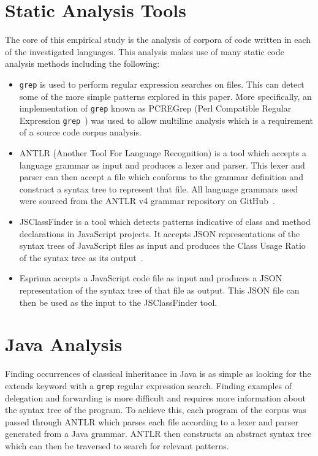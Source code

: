 \section{Static Analysis Tools}
The core of this empirical study is the analysis of corpora of code written in each of the investigated languages. This analysis makes use of many static code analysis methods including the following:
\begin{itemize}
	\item \texttt{grep} is used to perform regular expression searches on files. This can detect some of the more simple patterns explored in this paper. More specifically, an implementation of \texttt{grep} known as PCREGrep (Perl Compatible Regular Expression \texttt{grep}~\cite{Pcregrep}) was used to allow multiline analysis which is a requirement of a source code corpus analysis.
	\item ANTLR (Another Tool For Language Recognition) is a tool which accepts a language grammar as input and produces a lexer and parser. This lexer and parser can then accept a file which conforms to the grammar definition and construct a syntax tree to represent that file. All language grammars used were sourced from the ANTLR v4 grammar repository on GitHub~\cite{AntlrGrammars}.
	\item JSClassFinder is a tool which detects patterns indicative of class and method declarations in JavaScript projects. It accepts JSON representations of the syntax trees of JavaScript files as input and produces the Class Usage Ratio of the syntax tree as its output~\cite{JSClassFinder}.
	\item Esprima accepts a JavaScript code file as input and produces a JSON representation of the syntax tree of that file as output. This JSON file can then be used as the input to the JSClassFinder tool.
\end{itemize}

\section{Java Analysis}
Finding occurrences of classical inheritance in Java is as simple as looking for the extends keyword with a \texttt{grep} regular expression search. Finding examples of delegation and forwarding is more difficult and requires more information about the syntax tree of the program. To achieve this, each program of the corpus was passed through ANTLR which parses each file according to a lexer and parser generated from a Java grammar. ANTLR then constructs an abstract syntax tree which can then be traversed to search for relevant patterns.
\newline

